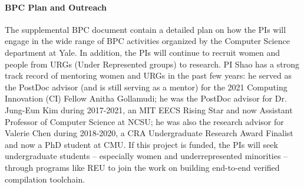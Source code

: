 \paragraph*{BPC Plan and Outreach}
The supplemental BPC document contain a detailed plan on how the PIs
will engage in the wide range of BPC activities organized by the
Computer Science department at Yale. In addition, the PIs will
continue to recruit women and people from URGs (Under Represented
groups) to research.  PI Shao has a strong track record of mentoring
women and URGs in the past few years: he served as the PostDoc advisor
(and is still serving as a mentor) for the 2021 Computing Innovation
(CI) Fellow Anitha Gollamudi; he was the PostDoc advisor for
Dr. Jung-Eun Kim during 2017-2021, an MIT EECS Rising Star and now
Assistant Professor of Computer Science at NCSU; he was also the
research advisor for Valerie Chen during 2018-2020, a CRA
Undergraduate Research Award Finalist and now a PhD student at CMU.
If this project is funded, the PIs will seek undergraduate students –
especially women and underrepresented minorities – through programs
like REU to join the work on building end-to-end verified compilation
toolchain.


